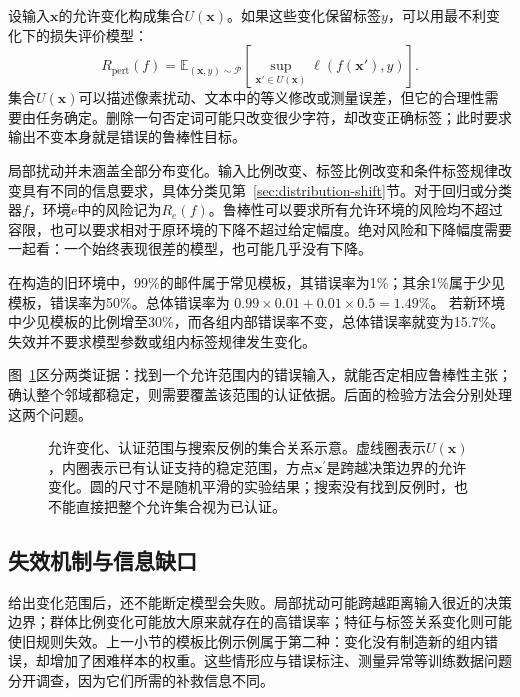 设输入$\bm{x}$的允许变化构成集合$U(\bm{x})$。如果这些变化保留标签$y$，可以用最不利变化下的损失评价模型：
\begin{equation}
 R_{\mathrm{pert}}(f)
 =\mathbb E_{(\bm{x},y)\sim\mathcal P}
   \left[\sup_{\bm{x}'\in U(\bm{x})}
   \ell(f(\bm{x}'),y)\right].
 \label{eq:robustness-perturbation-risk}
\end{equation}
集合$U(\bm{x})$可以描述像素扰动、文本中的等义修改或测量误差，但它的合理性需要由任务确定。删除一句否定词可能只改变很少字符，却改变正确标签；此时要求输出不变本身就是错误的鲁棒性目标。

局部扰动并未涵盖全部分布变化。输入比例改变、标签比例改变和条件标签规律改变具有不同的信息要求，具体分类见第~\ref{sec:distribution-shift}节。对于回归或分类器$f$，环境$e$中的风险记为$R_e(f)$。鲁棒性可以要求所有允许环境的风险均不超过容限，也可以要求相对于原环境的下降不超过给定幅度。绝对风险和下降幅度需要一起看：一个始终表现很差的模型，也可能几乎没有下降。

\begin{example}[总体表现掩盖群体脆弱性]
\label{ex:robustness-mixture}
在构造的旧环境中，99\%的邮件属于常见模板，其错误率为1\%；其余1\%属于少见模板，错误率为50\%。总体错误率为
$0.99\times0.01+0.01\times0.5=1.49\%$。
若新环境中少见模板的比例增至30\%，而各组内部错误率不变，总体错误率就变为15.7\%。失效并不要求模型参数或组内标签规律发生变化。
\end{example}

图~\ref{fig:trust-robust-neighborhood}区分两类证据：找到一个允许范围内的错误输入，就能否定相应鲁棒性主张；确认整个邻域都稳定，则需要覆盖该范围的认证依据。后面的检验方法会分别处理这两个问题。

\begin{figure}[!htb]
  \centering
  
  \caption{允许变化、认证范围与搜索反例的集合关系示意。虚线圈表示$U(\bm x)$，内圈表示已有认证支持的稳定范围，方点$\bm x^{\prime}$是跨越决策边界的允许变化。圆的尺寸不是随机平滑的实验结果；搜索没有找到反例时，也不能直接把整个允许集合视为已认证。}
  \label{fig:trust-robust-neighborhood}
\end{figure}

\subsection{失效机制与信息缺口}
\label{sec:robustness-failure-mechanisms}

给出变化范围后，还不能断定模型会失败。局部扰动可能跨越距离输入很近的决策边界；群体比例变化可能放大原来就存在的高错误率；特征与标签关系变化则可能使旧规则失效。上一小节的模板比例示例属于第二种：变化没有制造新的组内错误，却增加了困难样本的权重。这些情形应与错误标注、测量异常等训练数据问题分开调查，因为它们所需的补救信息不同。

